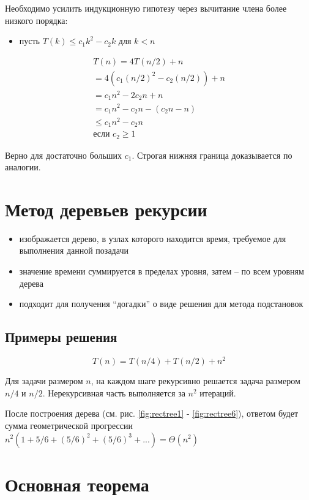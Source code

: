 \documentclass[a4paper,11pt]{article}
\begin{document}
Необходимо усилить индукционную гипотезу через вычитание члена более низкого 
порядка:
\begin{itemize}
\item пусть $T(k) \leqslant c_1 k^2 - c_2 k$ для $k < n$
\end{itemize}
\begin{align*}
  T(n) = 4T(n/2) + n \\
  = 4(c_1(n/2)^2 - c_2(n/2)) + n \\
  = c_1 n^2 - 2c_2 n + n \\
  = c_1 n^2 - c_2 n - (c_2 n - n) \\
  \leqslant c_1 n^2 - c_2 n \\
  \text{если } c_2 \geqslant 1
\end{align*}

Верно для достаточно больших $c_1$. Строгая нижняя граница доказывается по
аналогии.
\section{Метод деревьев рекурсии}
\begin{itemize}
\item изображается дерево, в узлах которого находится время, требуемое для
  выполнения данной позадачи
\item значение времени суммируется в пределах уровня, затем -- по всем
  уровням дерева
\item подходит для получения ``догадки'' о виде решения для метода подстановок
\end{itemize}

\subsection{Примеры решения}
\begin{equation*}
  T(n) = T(n/4) + T(n/2) + n^2 
\end{equation*}

Для задачи размером $n$, на каждом шаге рекурсивно решается задача размером
$n/4$ и $n/2$. Нерекурсивная часть выполняется за $n^2$ итераций.

После построения дерева (см. рис. \ref{fig:rectree1} - \ref{fig:rectree6}),
ответом будет сумма геометрической прогрессии
$n^2(1+5/6 + (5/6)^2 + (5/6)^3 + ...) = \Theta(n^2)$

\section{Основная теорема}
\end{document}
